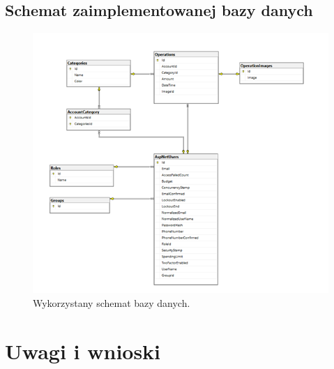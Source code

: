 \documentclass[12pt,a4paper,oneside]{article}
\begin{document}
\subsection{Schemat zaimplementowanej bazy danych}
\begin{figure}[H]
    \centering
    \includegraphics[width=\hsize,keepaspectratio]{images/DB2.png}
    \caption{Wykorzystany schemat bazy danych.}
\end{figure}

\section{Uwagi i wnioski}
\end{document}
